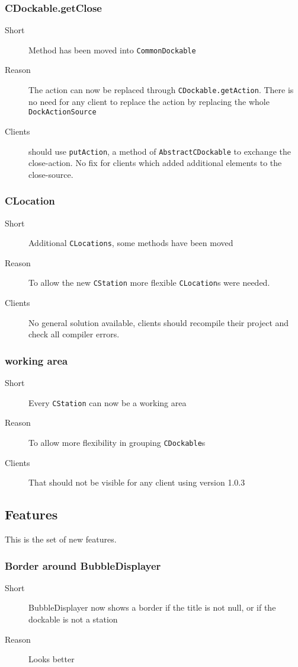 \documentclass[a4paper,10pt]{article}
\newcommand{\src}[1]{\lstinline[basicstyle=\normalsize\ttfamily,keywordstyle=\normalsize\ttfamily,identifierstyle=\normalsize\ttfamily]|#1|}
\newcommand{\short}{\item[Short]}
\newcommand{\why}{\item[Reason]}
\newcommand{\clients}{\item[Clients]}
\begin{document}
\subsubsection{CDockable.getClose}
\begin{description}
\short Method has been moved into \src{CommonDockable}
\why The action can now be replaced through \src{CDockable.getAction}. There is no need for any client to replace the action by replacing the whole \src{DockActionSource}
\clients should use \src{putAction}, a method of \src{AbstractCDockable} to exchange the close-action. No fix for clients which added additional elements to the close-source.
\end{description}

\subsubsection{CLocation}
\begin{description}
\short Additional \src{CLocations}, some methods have been moved
\why To allow the new \src{CStation} more flexible \src{CLocation}s were needed.
\clients No general solution available, clients should recompile their project and check all compiler errors.
\end{description}

\subsubsection{working area}
\begin{description}
\short Every \src{CStation} can now be a working area
\why To allow more flexibility in grouping \src{CDockable}s
\clients That should not be visible for any client using version 1.0.3
\end{description}


\subsection{Features}
This is the set of new features.

\subsubsection{Border around BubbleDisplayer}
\begin{description}
 \short BubbleDisplayer now shows a border if the title is not null, or if the dockable is not a station
 \why Looks better
\end{description}
\end{document}
